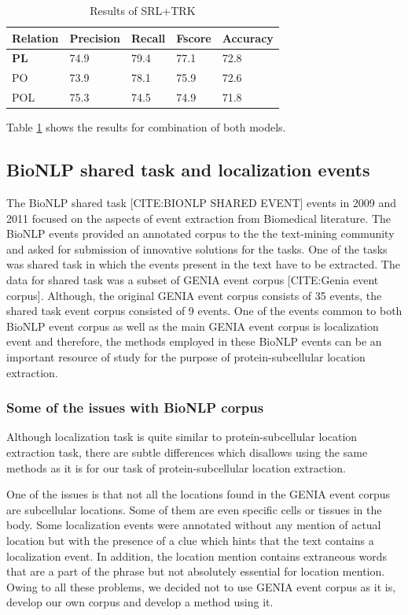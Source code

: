 \begin{table}
\centering
\begin{tabular}{|l|l|l|l|l|}
\hline
\textbf{Relation} & \textbf{Precision} & \textbf{Recall} & \textbf{Fscore} & \textbf{Accuracy} \\ \hline
\textbf{PL} & 74.9 & 79.4 & 77.1 & 72.8 \\
PO & 73.9 & 78.1 & 75.9 & 72.6 \\
POL & 75.3 & 74.5 & 74.9 &  71.8\\ \hline
\end{tabular}
\caption{Results of SRL+TRK}\label{tab:Liu}
\end{table}

Table \ref{tab:Liu} shows the results for combination of both models.

\subsection*{BioNLP shared task and localization events}
The BioNLP shared task [CITE:BIONLP SHARED EVENT] events in 2009 and 2011 focused on the aspects of event extraction from Biomedical literature. The BioNLP events provided an annotated corpus to the the text-mining community and asked for submission of innovative solutions for the tasks. One of the tasks was shared task in which the events present in the text have to be extracted. The data for shared task was a subset of GENIA event corpus [CITE:Genia event corpus]. Although, the original GENIA event corpus consists of 35 events, the shared task event corpus consisted of 9 events. One of the events common to both BioNLP event corpus as well as the main GENIA event corpus is localization event and therefore, the methods employed in these BioNLP events can be an important resource of study for the purpose of protein-subcellular location extraction.

\subsubsection*{Some of the issues with BioNLP corpus}

Although localization task is quite similar to protein-subcellular location extraction task, there are subtle differences which disallows using the same methods as it is for our task of protein-subcellular location extraction. 

One of the issues is that not all the locations found in the GENIA event corpus are subcellular locations. Some of them are even specific cells or tissues in the body. Some localization events were annotated without any mention of actual location but with the presence of a clue which hints that the text contains a localization event. In addition, the location mention contains extraneous words that are a part of the phrase but not absolutely essential for location mention. Owing to all these problems, we decided not to use GENIA event corpus as it is, develop our own corpus and develop a method using it.

